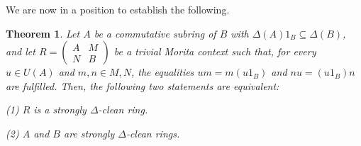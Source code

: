 \documentclass[12pt]{amsart}
\newtheorem{theorem}{Theorem}[section]
\theoremstyle{definition}
\begin{document}
We are now in a position to establish the following.

\begin{theorem}\label{com morita}
Let $A$ be a commutative subring of $B$ with $\Delta(A)1_B \subseteq \Delta(B)$, and let $R = \begin{pmatrix}
A & M\\
N & B
\end{pmatrix}$ be a trivial Morita context such that, for every $u \in U(A)$ and $m,n \in M,N$, the equalities $um=m(u1_B)$ and $nu=(u1_B)n$ are fulfilled. Then, the following two statements are equivalent:

(1) \quad $R$ is a strongly $\Delta$-clean ring.

(2) \quad $A$ and $B$ are strongly $\Delta$-clean rings.

\end{theorem}
\end{document}
